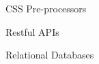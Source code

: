 \begin{minipage}[b]{0.33333\textwidth}
\begin{cvskills}

  \cvskill
    {}
    {CSS Pre-processors}

 
\end{cvskills}
\end{minipage}%
\begin{minipage}[b]{0.33333\textwidth}
\begin{cvskills}

  \cvskill
    {}
    {Restful APIs}

 
\end{cvskills}
\end{minipage}%
\begin{minipage}[b]{0.33333\textwidth}
\begin{cvskills}

  \cvskill
    {}
    {Relational Databases}

 
\end{cvskills}
\end{minipage}

%